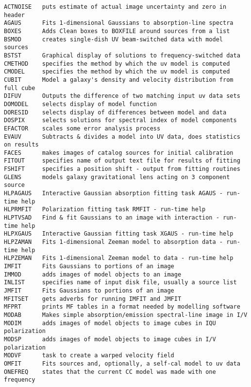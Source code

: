 
\vskip 0.5pt
\bbve\begin{verbatim}
ACTNOISE   puts estimate of actual image uncertainty and zero in header
AGAUS      Fits 1-dimensional Gaussians to absorption-line spectra
BOXES      Adds Clean boxes to BOXFILE around sources from a list
BSMOD      creates single-dish UV beam-switched data with model sources
BSTST      Graphical display of solutions to frequency-switched data
CMETHOD    specifies the method by which the uv model is computed
CMODEL     specifies the method by which the uv model is computed
CUBIT      Model a galaxy's density and velocity distribution from full cube
DIFUV      Outputs the difference of two matching input uv data sets
DOMODEL    selects display of model function
DORESID    selects display of differences between model and data
DOSPIX     selects solutions for spectral index of model components
EFACTOR    scales some error analysis process
EVAUV      Subtracts & divides a model into UV data, does statistics on results
FACES      makes images of catalog sources for initial calibration
FITOUT     specifies name of output text file for results of fitting
FSHIFT     specifies a position shift - output from fitting routines
GLENS      models galaxy gravitational lens acting on 3 component source
HLPAGAUS   Interactive Gaussian absorption fitting task AGAUS - run-time help
HLPRMFIT   Polarization fitting task RMFIT - run-time help
HLPTVSAD   Find & fit Gaussians to an image with interaction - run-time help
HLPXGAUS   Interactive Gaussian fitting task XGAUS - run-time help
HLPZAMAN   Fits 1-dimensional Zeeman model to absorption data - run-time help
HLPZEMAN   Fits 1-dimensional Zeeman model to data - run-time help
IMFIT      Fits Gaussians to portions of an image
IMMOD      adds images of model objects to an image
INLIST     specifies name of input disk file, usually a source list
JMFIT      Fits Gaussians to portions of an image
MFITSET    gets adverbs for running IMFIT and JMFIT
MFPRT      prints MF tables in a format needed by modelling software
MODAB      Makes simple absorption/emission spectral-line image in I/V
MODIM      adds images of model objects to image cubes in IQU polarization
MODSP      adds images of model objects to image cubes in I/V polarization
MODVF      task to create a warped velocity field
OMFIT      Fits sources and, optionally, a self-cal model to uv data
ONEFREQ    states that the current CC model was made with one frequency

\end{verbatim}
